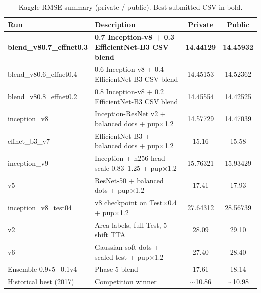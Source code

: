 \documentclass[12pt, a4paper]{article}
\begin{document}
\begin{table}[htbp]
\centering
\caption{Kaggle RMSE summary (private / public). Best submitted CSV in bold.}
\label{tab:kaggle_all}
\begin{tabular}{@{}llcc@{}}
\toprule
\textbf{Run} & \textbf{Description} & \textbf{Private} & \textbf{Public} \\ \midrule
\textbf{blend\_v80.7\_effnet0.3} & \textbf{0.7 Inception-v8 + 0.3 EfficientNet-B3 CSV blend} & \textbf{14.44129} & \textbf{14.45932} \\
blend\_v80.6\_effnet0.4 & 0.6 Inception-v8 + 0.4 EfficientNet-B3 CSV blend & 14.45153 & 14.52362 \\
blend\_v80.8\_effnet0.2 & 0.8 Inception-v8 + 0.2 EfficientNet-B3 CSV blend & 14.45554 & 14.42525 \\
inception\_v8 & Inception-ResNet v2 + balanced dots + pup$\times$1.2 & 14.57729 & 14.47039 \\
effnet\_b3\_v7 & EfficientNet-B3 + balanced dots + pup$\times$1.2 & 15.16 & 15.58 \\
inception\_v9 & Inception + h256 head + scale 0.83--1.25 + pup$\times$1.2 & 15.76321 & 15.93429 \\
v5 & ResNet-50 + balanced dots + pup$\times$1.2 & 17.41 & 17.93 \\
inception\_v8\_test04 & v8 checkpoint on Test$\times$0.4 + pup$\times$1.2 & 27.64312 & 28.56739 \\
v2 & Area labels, full Test, 5-shift TTA & 28.09 & 29.10 \\
v6 & Gaussian soft dots + scaled test + pup$\times$1.2 & 27.40 & 28.40 \\
Ensemble 0.9v5+0.1v4 & Phase 5 blend & 17.61 & 18.14 \\
Historical best (2017) & Competition winner & $\sim$10.86 & $\sim$10.98 \\ \bottomrule
\end{tabular}
\end{table}
\end{document}
